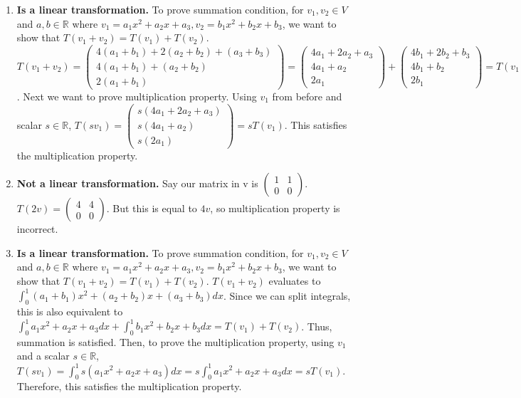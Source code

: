 \documentclass{article}
\begin{document}
\begin{enumerate}
\begin{enumerate}
\item \textbf{Is a linear transformation.} To prove summation condition, for $v_1,v_2 \in V$ and $a,b \in \mathbb{R}$ where $v_1 = a_1 x^2 + a_2 x + a_3, v_2 = b_1 x^2 + b_2 x + b_3$, we want to show that $T(v_1 + v_2) = T(v_1) + T(v_2)$. $T(v_1 + v_2) = \left(\begin{array}{c} 4(a_1 + b_1) + 2(a_2 + b_2) + (a_3 + b_3) \\ 4(a_1 + b_1) + (a_2 + b_2) \\ 2(a_1 + b_1)\end{array}\right) = \left(\begin{array}{c} 4a_1 + 2a_2 + a_3 \\ 4a_1 + a_2 \\ 2a_1 \end{array}\right) + \left(\begin{array}{c} 4b_1 + 2b_2 + b_3 \\ 4b_1 + b_2 \\ 2b_1 \end{array}\right) = T(v_1) + T(v_2)$. Next we want to prove multiplication property. Using $v_1$ from before and scalar $s \in \mathbb{R}$, $T(sv_1) = \left(\begin{array}{c} s (4a_1 + 2a_2 + a_3) \\ s (4a_1 + a_2) \\ s(2a_1) \end{array}\right) = s T(v_1)$. This satisfies the multiplication property.

\item \textbf{Not a linear transformation.} Say our matrix in v is $\left(\begin{array}{cc} 1 & 1 \\ 0 & 0 \end{array}\right)$. $T(2v) = \left(\begin{array}{cc} 4 & 4 \\ 0 & 0 \end{array}\right)$. But this is equal to $4v$, so multiplication property is incorrect.

\item \textbf{Is a linear transformation.} To prove summation condition, for $v_1,v_2 \in V$ and $a,b \in \mathbb{R}$ where  $v_1 = a_1 x^2 + a_2 x + a_3, v_2 = b_1 x^2 + b_2 x + b_3$, we want to show that $T(v_1 + v_2) = T(v_1) + T(v_2)$. $T(v_1 + v_2) $ evaluates to $\int_{0}^{1} (a_1 + b_1)x^2 + (a_2+b_2)x + (a_3 + b_3) dx$. Since we can split integrals, this is also equivalent to $\int_{0}^{1} a_1x^2 + a_2x + a_3 dx + \int_{0}^{1} b_1x^2 + b_2x + b_3 dx = T(v_1) + T(v_2)$. Thus, summation is satisfied. Then, to prove the multiplication property, using $v_1$ and a scalar $s \in \mathbb{R}$, $T(sv_1) = \int_{0}^{1} s(a_1x^2 + a_2x + a_3) dx = s \int_{0}^{1} a_1x^2 + a_2x + a_3 dx = sT(v_1)$. Therefore, this satisfies the multiplication property.


\end{enumerate}
\end{enumerate}
\end{document}
